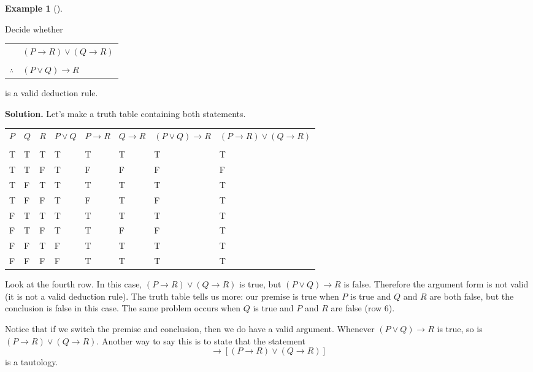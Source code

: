\documentclass[10pt,]{book}
\theoremstyle{plain}
\theoremstyle{definition}
\newtheorem{example}[theorem]{Example}
\theoremstyle{definition}
\theoremstyle{definition}
\numberwithin{equation}{chapter}
\newcommand{\hrulethin}  {\noalign{\hrule height 0.04em}}
\def\imp{\rightarrow}
\begin{document}
\begin{example}[]\label{example-86}

              Decide whether
\begin{tabular}{ll}
&\((P \imp R) \vee (Q \imp R)\)\tabularnewline[0pt]
&\tabularnewline\hrulethin
\(\therefore\)&\((P \vee Q) \imp R\)
\end{tabular}
\par

              is a valid deduction rule.
\par\medskip\noindent%
\textbf{Solution.}\quad
              Let's make a truth table containing both statements.
\begin{tabular}{llllllll}
\(P\)&\(Q\)&\(R\)&\(P\vee Q\)&\(P \imp R\)&\(Q \imp R\)&\((P\vee Q) \imp R\)&\((P\imp R) \vee (Q \imp R)\)\tabularnewline[0pt]
&&&&&&&\tabularnewline\hrulethin
T&T&T&T&T&T&T&T\tabularnewline[0pt]
T&T&F&T&F&F&F&F\tabularnewline[0pt]
T&F&T&T&T&T&T&T\tabularnewline[0pt]
T&F&F&T&F&T&F&T\tabularnewline[0pt]
F&T&T&T&T&T&T&T\tabularnewline[0pt]
F&T&F&T&T&F&F&T\tabularnewline[0pt]
F&F&T&F&T&T&T&T\tabularnewline[0pt]
F&F&F&F&T&T&T&T\tabularnewline[0pt]

\end{tabular}
\par

              Look at the fourth row. In this case, \((P \imp R) \vee (Q \imp R)\) is true, but \((P \vee Q) \imp R\) is false. Therefore the argument form is not valid (it is not a valid deduction rule). The truth table tells us more: our premise is true when \(P\) is true and \(Q\) and \(R\) are both false, but the conclusion is false in this case. The same problem occurs when \(Q\) is true and \(P\) and \(R\) are false (row 6).
\par

              Notice that if we switch the premise and conclusion, then we do have a valid argument. Whenever \((P\vee Q) \imp R\) is true, so is \((P \imp R) \vee (Q \imp R)\). Another way to say this is to state that the statement
              \begin{equation*}
                [(P \vee Q) \imp R] \imp [(P \imp R) \vee (Q \imp R)]
              \end{equation*}
              is a tautology.
\end{example}
\typeout{************************************************}
\typeout{************************************************}
\end{document}
